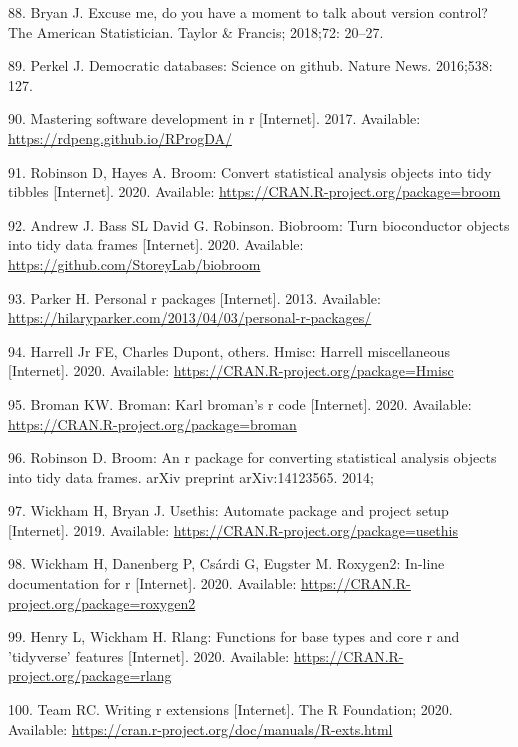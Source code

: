 \documentclass[10pt,letterpaper]{article}
\begin{document}
\leavevmode\hypertarget{ref-bryan2018}{}%
88. Bryan J. Excuse me, do you have a moment to talk about version
control? The American Statistician. Taylor \& Francis; 2018;72: 20--27.

\leavevmode\hypertarget{ref-perkel2016}{}%
89. Perkel J. Democratic databases: Science on github. Nature News.
2016;538: 127.

\leavevmode\hypertarget{ref-peng2017}{}%
90. Mastering software development in r {[}Internet{]}. 2017. Available:
\url{https://rdpeng.github.io/RProgDA/}

\leavevmode\hypertarget{ref-broom}{}%
91. Robinson D, Hayes A. Broom: Convert statistical analysis objects
into tidy tibbles {[}Internet{]}. 2020. Available:
\url{https://CRAN.R-project.org/package=broom}

\leavevmode\hypertarget{ref-biobroom}{}%
92. Andrew J. Bass SL David G. Robinson. Biobroom: Turn bioconductor
objects into tidy data frames {[}Internet{]}. 2020. Available:
\url{https://github.com/StoreyLab/biobroom}

\leavevmode\hypertarget{ref-parker2013}{}%
93. Parker H. Personal r packages {[}Internet{]}. 2013. Available:
\url{https://hilaryparker.com/2013/04/03/personal-r-packages/}

\leavevmode\hypertarget{ref-Hmisc}{}%
94. Harrell Jr FE, Charles Dupont, others. Hmisc: Harrell miscellaneous
{[}Internet{]}. 2020. Available:
\url{https://CRAN.R-project.org/package=Hmisc}

\leavevmode\hypertarget{ref-broman}{}%
95. Broman KW. Broman: Karl broman's r code {[}Internet{]}. 2020.
Available: \url{https://CRAN.R-project.org/package=broman}

\leavevmode\hypertarget{ref-robinson2014}{}%
96. Robinson D. Broom: An r package for converting statistical analysis
objects into tidy data frames. arXiv preprint arXiv:14123565. 2014;

\leavevmode\hypertarget{ref-usethis}{}%
97. Wickham H, Bryan J. Usethis: Automate package and project setup
{[}Internet{]}. 2019. Available:
\url{https://CRAN.R-project.org/package=usethis}

\leavevmode\hypertarget{ref-roxygen2}{}%
98. Wickham H, Danenberg P, Csárdi G, Eugster M. Roxygen2: In-line
documentation for r {[}Internet{]}. 2020. Available:
\url{https://CRAN.R-project.org/package=roxygen2}

\leavevmode\hypertarget{ref-rlang}{}%
99. Henry L, Wickham H. Rlang: Functions for base types and core r and
'tidyverse' features {[}Internet{]}. 2020. Available:
\url{https://CRAN.R-project.org/package=rlang}

\leavevmode\hypertarget{ref-Rcore2020}{}%
100. Team RC. Writing r extensions {[}Internet{]}. The R Foundation;
2020. Available:
\url{https://cran.r-project.org/doc/manuals/R-exts.html}

\nolinenumbers
\end{document}

